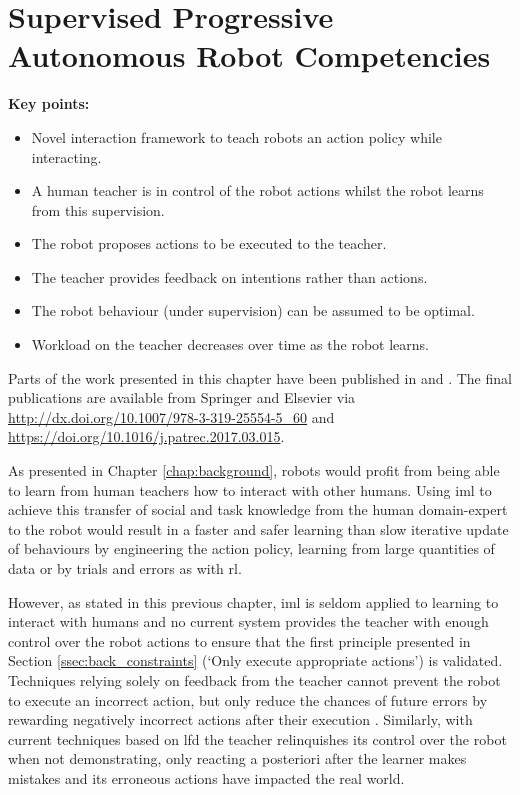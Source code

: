 \chapter{Supervised Progressive Autonomous Robot \newline Competencies}\label{chap:sparc}

\graphicspath{{images/sparc/}}

\begin{framed}
	\textbf{Key points:}
	\begin{itemize}
		\item Novel interaction framework to teach robots an action policy while interacting.
		\item A human teacher is in control of the robot actions whilst the robot learns from this supervision.
		\item The robot proposes actions to be executed to the teacher.
		\item The teacher provides feedback on intentions rather than actions.
		\item The robot behaviour (under supervision) can be assumed to be optimal.
		\item Workload on the teacher decreases over time as the robot learns.
	\end{itemize}
\end{framed}

Parts of the work presented in this chapter have been published in \cite{senft2015sparc} and \cite{senft2017supervised}. The final publications are available from Springer and Elsevier via \url{http://dx.doi.org/10.1007/978-3-319-25554-5_60} and \url{https://doi.org/10.1016/j.patrec.2017.03.015}.

\newpage

As presented in Chapter \ref{chap:background}, robots would profit from being able to learn from human teachers how to interact with other humans. Using \gls{iml} to achieve this transfer of social and task knowledge from the human domain-expert to the robot would result in a faster and safer learning than slow iterative update of behaviours by engineering the action policy, learning from large quantities of data or by trials and errors as with \gls{rl}.

However, as stated in this previous chapter, \gls{iml} is seldom applied to learning to interact with humans and no current system provides the teacher with enough control over the robot actions to ensure that the first principle presented in Section \ref{ssec:back_constraints} (`Only execute appropriate actions') is validated. Techniques relying solely on feedback from the teacher cannot prevent the robot to execute an incorrect action, but only reduce the chances of future errors by rewarding negatively incorrect actions after their execution \citep{senft2017supervised}. Similarly, with current techniques based on \gls{lfd} the teacher relinquishes its control over the robot when not demonstrating, only reacting a posteriori after the learner makes mistakes and its erroneous actions have impacted the real world.

